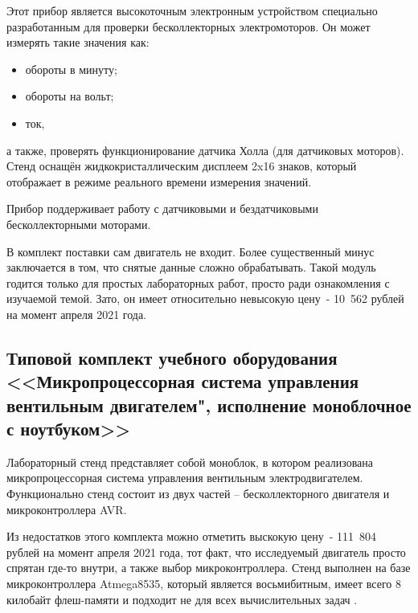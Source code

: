 Этот прибор является высокоточным электронным устройством специально разработанным для 
проверки бесколлекторных электромоторов. Он может измерять такие значения как:

\begin{itemize}
  \item обороты в минуту;
  \item обороты на вольт;
  \item ток,
\end{itemize}

а также, проверять функционирование датчика Холла (для датчиковых моторов). 
Стенд оснащён жидкокристаллическим дисплеем 2x16 знаков, который отображает в 
режиме реального времени измерения значений.

Прибор поддерживает работу с датчиковыми и бездатчиковыми бесколлекторными моторами.

В комплект поставки сам двигатель не входит. Более существенный минус заключается в том, что 
снятые данные сложно обрабатывать. Такой модуль
годится только для простых лабораторных работ, просто ради ознакомления с изучаемой темой. Зато, 
он имеет относительно невысокую цену~- 10~562 рублей на момент апреля 2021 года.

\subsection{
  Типовой комплект учебного оборудования <<Микропроцессорная система управления вентильным двигателем", исполнение моноблочное с ноутбуком>>
}


Лабораторный стенд представляет собой моноблок, в котором реализована микропроцессорная 
система управления вентильным электродвигателем. Функционально стенд состоит из двух 
частей – бесколлекторного двигателя и микроконтроллера AVR.

Из недостатков этого комплекта можно отметить выскокую цену~- 111~804 рублей на 
момент апреля 2021 года, тот факт, что исследуемый двигатель просто спрятан где-то внутри, 
а также выбор микроконтроллера. Стенд выполнен на базе 
микроконтроллера \mbox{Atmega8535}, который является восьмибитным, имеет всего 8 килобайт 
флеш-памяти и подходит не для всех вычислительных задач \cite{tooslow}.